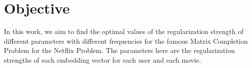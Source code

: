 \documentclass[11pt, english]{article}
\begin{document}
\tableofcontents
\newpage
\section{Objective}
In this work, we aim to find the optimal values of the regularization strength of different parameters with different frequencies for the famous Matrix Completion Problem for the Netflix Problem. The parameters here are the regularization strengths of each embedding vector for each user and each movie.  
\end{document}
